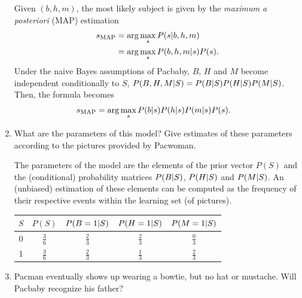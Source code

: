\documentclass[11pt, a4paper]{article}
\begin{document}
\begin{enumerate}
    \begin{solution}
        Given $(b, h, m)$, the most likely subject is given by the \emph{maximum a posteriori} (MAP) estimation
        \begin{align*}
            s_{\text{MAP}} & = \arg\max_{s} P(s \vert b, h, m) \\
            & = \arg\max_{s} P(b, h, m \vert s) P(s) .
        \end{align*}
        Under the naive Bayes assumptions of Pacbaby, $B$, $H$ and $M$ become independent conditionally to $S$, \ie{} $P(B, H, M \vert S) = P(B \vert S) P(H \vert S) P(M \vert S)$. Then, the formula becomes
        \begin{align*}
            s_{\text{MAP}} & = \arg\max_{s} P(b \vert s) P(h \vert s) P(m \vert s) P(s) .
        \end{align*}
    \end{solution}

    \item What are the parameters of this model? Give estimates of these parameters according to the pictures provided by Pacwoman.

    \begin{solution}
        The parameters of the model are the elements of
        the prior vector $P(S)$ and the (conditional) probability matrices $P(B \vert S)$, $P(H \vert S)$ and $P(M \vert S)$. An (unbiased) estimation of these elements can be computed as the frequency of their respective events within the learning set (of pictures).

        \begin{table}[h]
            \centering
            \begin{tabular}{c|cccc}
                \toprule
                $S$ & $P(S)$ & $P(B = 1 \vert S)$ & $P(H = 1 \vert S)$ & $P(M = 1 \vert S)$ \\
                \midrule
                0 & $\frac{3}{6}$ & $\frac{2}{3}$ & $\frac{2}{3}$ & $\frac{0}{3}$ \\
                1 & $\frac{3}{6}$ & $\frac{2}{3}$ & $\frac{1}{3}$ & $\frac{2}{3}$ \\
                \bottomrule
            \end{tabular}
        \end{table}
    \end{solution}

    \item Pacman eventually shows up wearing a bowtie, but no hat or mustache. Will Pacbaby recognize his father?


\end{enumerate}
\end{document}
